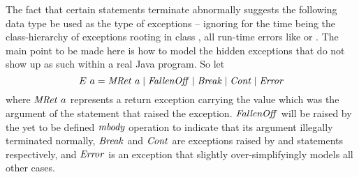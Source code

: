The fact that certain statements terminate abnormally suggests the following
data type be used as the type of exceptions -- ignoring for the time being the
class-hierarchy of exceptions rooting in class , \IE all
run-time errors like  or
. The main point to be made here is how to model the hidden
exceptions that do not show up as such within a real Java program. So let
\[
E\ a = \mathit{MRet}\ a \;|\; \mathit{FallenOff} \;|\; \mathit{Break} \;|\; \mathit{Cont} \;|\; \mathit{Error}
\]
where $\mathit{MRet}\ a$ represents a return exception carrying the value
which was the argument of the  statement that raised the exception.
$\mathit{FallenOff}$ will be raised by the yet to be defined $\mathit{mbody}$ operation to
indicate that its argument illegally terminated normally, $\mathit{Break}$ and
$\mathit{Cont}$ are exceptions raised by  and  statements
respectively, and $\mathit{Error}$ is an exception that slightly over-simplifyingly models
all other cases.
 
